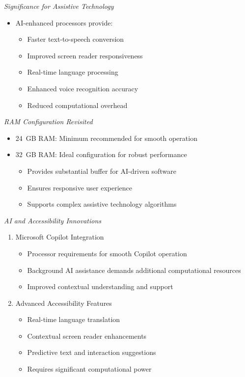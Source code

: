 \emph{Significance for Assistive Technology}
\begin{itemize}
    \item AI-enhanced processors provide:
        \begin{itemize}
            \item Faster text-to-speech conversion
            \item Improved screen reader responsiveness
            \item Real-time language processing
            \item Enhanced voice recognition accuracy
            \item Reduced computational overhead
        \end{itemize}
\end{itemize}

\emph{RAM Configuration Revisited}
\begin{itemize}
    \item 24~GB RAM: Minimum recommended for smooth operation
    \item 32~GB RAM: Ideal configuration for robust performance
        \begin{itemize}
            \item Provides substantial buffer for AI-driven software
            \item Ensures responsive user experience
            \item Supports complex assistive technology algorithms
        \end{itemize}
\end{itemize}

\emph{AI and Accessibility Innovations}
\begin{enumerate}
    \item Microsoft Copilot Integration
        \begin{itemize}
            \item Processor requirements for smooth Copilot operation
            \item Background AI assistance demands additional computational resources
            \item Improved contextual understanding and support
        \end{itemize}
    \item Advanced Accessibility Features
        \begin{itemize}
            \item Real-time language translation
            \item Contextual screen reader enhancements
            \item Predictive text and interaction suggestions
            \item Requires significant computational power
        \end{itemize}
\end{enumerate}

